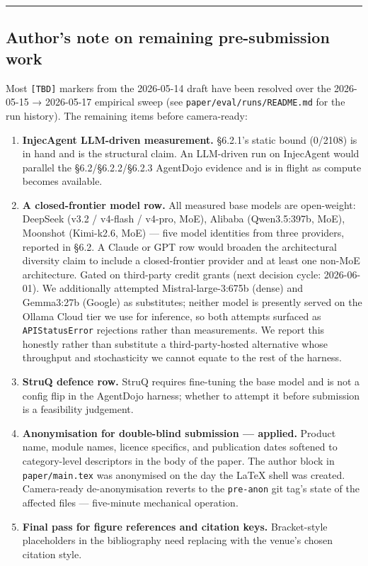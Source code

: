 \begin{center}\rule{0.5\linewidth}{0.5pt}\end{center}

\subsection{Author's note on remaining pre-submission
work}\label{authors-note-on-remaining-pre-submission-work}

Most \texttt{{[}TBD{]}} markers from the 2026-05-14 draft have been
resolved over the 2026-05-15 → 2026-05-17 empirical sweep (see
\texttt{paper/eval/runs/README.md} for the run history). The remaining
items before camera-ready:

\begin{enumerate}
\def\labelenumi{\arabic{enumi}.}
\tightlist
\item
  \textbf{InjecAgent LLM-driven measurement.} §6.2.1's static bound
  (0/2108) is in hand and is the structural claim. An LLM-driven run on
  InjecAgent would parallel the §6.2/§6.2.2/§6.2.3 AgentDojo evidence
  and is in flight as compute becomes available.
\item
  \textbf{A closed-frontier model row.} All measured base models are
  open-weight: DeepSeek (v3.2 / v4-flash / v4-pro, MoE), Alibaba
  (Qwen3.5:397b, MoE), Moonshot (Kimi-k2.6, MoE) --- five model
  identities from three providers, reported in §6.2. A Claude or GPT row
  would broaden the architectural diversity claim to include a
  closed-frontier provider and at least one non-MoE architecture. Gated
  on third-party credit grants (next decision cycle: 2026-06-01). We
  additionally attempted Mistral-large-3:675b (dense) and Gemma3:27b
  (Google) as substitutes; neither model is presently served on the
  Ollama Cloud tier we use for inference, so both attempts surfaced as
  \texttt{APIStatusError} rejections rather than measurements. We report
  this honestly rather than substitute a third-party-hosted alternative
  whose throughput and stochasticity we cannot equate to the rest of the
  harness.
\item
  \textbf{StruQ defence row.} StruQ requires fine-tuning the base model
  and is not a config flip in the AgentDojo harness; whether to attempt
  it before submission is a feasibility judgement.
\item
  \textbf{Anonymisation for double-blind submission --- applied.}
  Product name, module names, licence specifics, and publication dates
  softened to category-level descriptors in the body of the paper. The
  author block in \texttt{paper/main.tex} was anonymised on the day the
  LaTeX shell was created. Camera-ready de-anonymisation reverts to the
  \texttt{pre-anon} git tag's state of the affected files ---
  five-minute mechanical operation.
\item
  \textbf{Final pass for figure references and citation keys.}
  Bracket-style placeholders in the bibliography need replacing with the
  venue's chosen citation style.
\end{enumerate}

